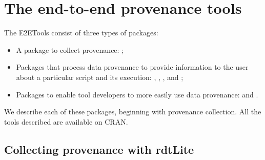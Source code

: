 \section{The end-to-end provenance tools}


The E2ETools consist of three types of packages: 
\begin{itemize}
    \item A package to collect provenance: ;
    \item Packages that process data provenance to provide information to the user about a particular script and its execution:  , , , and ;
    \item Packages to enable tool developers to more easily use data provenance:   and .
\end{itemize}



We describe each of these packages, beginning with provenance collection.  All the tools described are available on CRAN.


\subsection{Collecting provenance with rdtLite}

